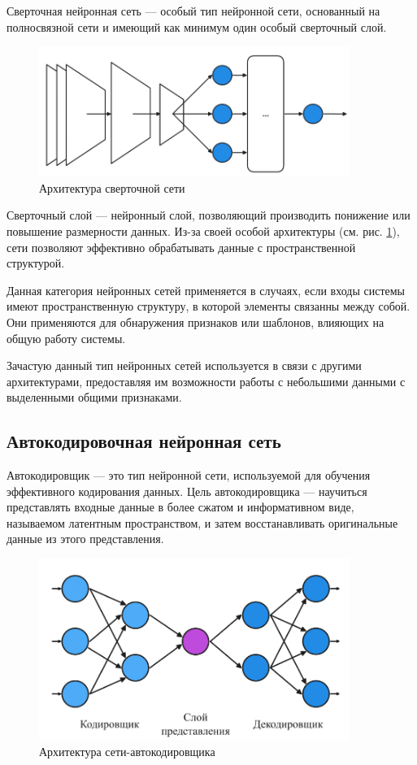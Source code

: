 Сверточная нейронная сеть — особый тип нейронной сети, основанный на
полносвязной сети и имеющий как минимум один особый сверточный слой. 

\begin{figure}[H]
  \centering
    \includegraphics[width=0.9\textwidth]{figures/arch_cnn.png}
  \caption{Архитектура сверточной сети}\label{fig:cnn}
\end{figure}

Сверточный слой — нейронный слой, позволяющий производить понижение или повышение
размерности данных. Из-за своей особой архитектуры (см. рис. \ref{fig:cnn}),
сети позволяют эффективно обрабатывать данные с пространственной структурой.

Данная категория нейронных сетей применяется в случаях, если входы системы
имеют пространственную структуру, в которой элементы связанны между собой. Они
применяются для обнаружения признаков или шаблонов, влияющих на общую работу
системы.

Зачастую данный тип нейронных сетей используется в связи с другими
архитектурами, предоставляя им возможности работы с небольшими данными с
выделенными общими признаками.

\subsection{Автокодировочная нейронная сеть}

Автокодировщик — это тип нейронной сети, используемой для обучения эффективного
кодирования данных. Цель автокодировщика — научиться представлять входные
данные в более сжатом и информативном виде, называемом латентным пространством,
и затем восстанавливать оригинальные данные из этого представления. 
\begin{figure}[H]
  \centering
    \includegraphics[width=0.9\textwidth]{figures/arch_autoencoder.png}
  \caption{Архитектура сети-автокодировщика}\label{fig:autoencoder}
\end{figure}

